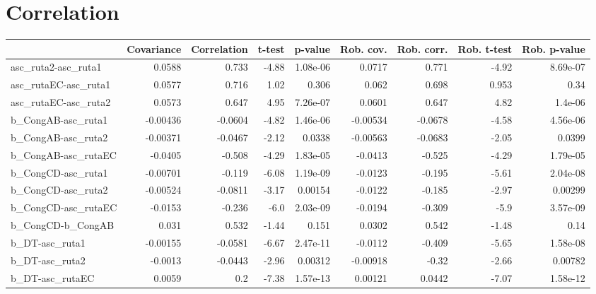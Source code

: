 \section{Correlation}
\begin{tabular}{lrrrrrrrr}
\toprule
{} &  Covariance &  Correlation &  t-test &  p-value &  Rob. cov. &  Rob. corr. &  Rob. t-test &  Rob. p-value \\
\midrule
asc\_ruta2-asc\_ruta1  &      0.0588 &        0.733 &   -4.88 & 1.08e-06 &     0.0717 &       0.771 &        -4.92 &      8.69e-07 \\
asc\_rutaEC-asc\_ruta1 &      0.0577 &        0.716 &    1.02 &    0.306 &      0.062 &       0.698 &        0.953 &          0.34 \\
asc\_rutaEC-asc\_ruta2 &      0.0573 &        0.647 &    4.95 & 7.26e-07 &     0.0601 &       0.647 &         4.82 &       1.4e-06 \\
b\_CongAB-asc\_ruta1   &    -0.00436 &      -0.0604 &   -4.82 & 1.46e-06 &   -0.00534 &     -0.0678 &        -4.58 &      4.56e-06 \\
b\_CongAB-asc\_ruta2   &    -0.00371 &      -0.0467 &   -2.12 &   0.0338 &   -0.00563 &     -0.0683 &        -2.05 &        0.0399 \\
b\_CongAB-asc\_rutaEC  &     -0.0405 &       -0.508 &   -4.29 & 1.83e-05 &    -0.0413 &      -0.525 &        -4.29 &      1.79e-05 \\
b\_CongCD-asc\_ruta1   &    -0.00701 &       -0.119 &   -6.08 & 1.19e-09 &    -0.0123 &      -0.195 &        -5.61 &      2.04e-08 \\
b\_CongCD-asc\_ruta2   &    -0.00524 &      -0.0811 &   -3.17 &  0.00154 &    -0.0122 &      -0.185 &        -2.97 &       0.00299 \\
b\_CongCD-asc\_rutaEC  &     -0.0153 &       -0.236 &    -6.0 & 2.03e-09 &    -0.0194 &      -0.309 &         -5.9 &      3.57e-09 \\
b\_CongCD-b\_CongAB    &       0.031 &        0.532 &   -1.44 &    0.151 &     0.0302 &       0.542 &        -1.48 &          0.14 \\
b\_DT-asc\_ruta1       &    -0.00155 &      -0.0581 &   -6.67 & 2.47e-11 &    -0.0112 &      -0.409 &        -5.65 &      1.58e-08 \\
b\_DT-asc\_ruta2       &     -0.0013 &      -0.0443 &   -2.96 &  0.00312 &   -0.00918 &       -0.32 &        -2.66 &       0.00782 \\
b\_DT-asc\_rutaEC      &      0.0059 &          0.2 &   -7.38 & 1.57e-13 &    0.00121 &      0.0442 &        -7.07 &      1.58e-12 \\

\end{tabular}
